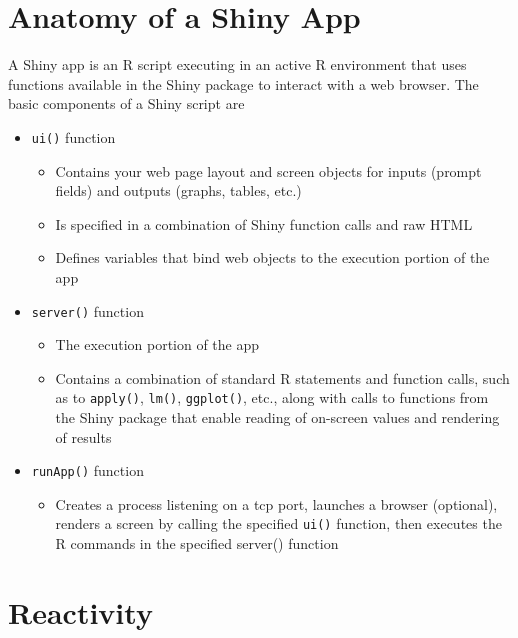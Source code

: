\documentclass[10pt, letterpaper]{article}
\begin{document}
\begin{spacing}{1.0}
\section{Anatomy of a Shiny App}\label{sec:anatomyofapp}

A Shiny app is an R script executing in an active R environment that uses functions available in the Shiny package to interact with a web browser.  The basic components of a Shiny script are

\begin{itemize}
    \item \texttt{ui()} function
    \begin{itemize}
        \item Contains your web page layout and screen objects for inputs (prompt fields) and outputs (graphs, tables, etc.)
        \item Is specified in a combination of Shiny function calls and raw HTML
        \item Defines variables that bind web objects to the execution portion of the app
    \end{itemize}
    \item \texttt{server()} function
    \begin{itemize}
        \item The execution portion of the app
        \item Contains a combination of standard R statements and function calls, such as to \texttt{apply()}, \texttt{lm()}, \texttt{ggplot()}, etc., along with calls to functions from the Shiny package that enable reading of on-screen values and rendering of results
    \end{itemize}
    \item \texttt{runApp()} function
    \begin{itemize}
        \item Creates a process listening on a tcp port, launches a browser (optional), renders a screen by calling the specified \texttt{ui()} function, then executes the R commands in the specified server() function
    \end{itemize}
\end{itemize}


\vspace{0.25in}

\section{Reactivity}\label{sec:reactivity}


\end{spacing}
\end{document}
